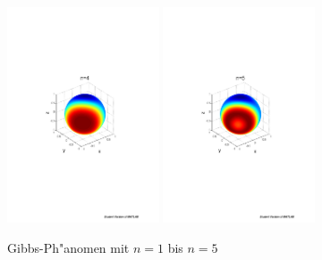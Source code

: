 \begin{refsection}
\begin{figure}
\includegraphics[width=0.4\textwidth]{kugel/Gibbs/GibbsN_4.pdf}
\includegraphics[width=0.4\textwidth]{kugel/Gibbs/GibbsN_5.pdf}
\caption{Gibbs-Ph"anomen mit $n=1$ bis $n=5$
\label{skript:Gibbs1}}
\end{figure}


\end{refsection}
